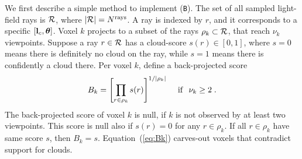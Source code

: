 \documentclass[runningheads]{llncs}
\begin{document}
We first describe a simple method to implement ({\tt B}).  The set of all sampled light-field rays is ${\cal R}$, where
\mbox{$|{\cal R}|=N^{\rm rays}$}. A ray is indexed by $r$, and it corresponds to a specific $[{\bf l}_c,{\bm \theta}]$. Voxel $k$ projects to a subset of the rays $\rho_k\subset{\cal R}$,
that reach $\nu_k$ viewpoints. Suppose a ray $r\in{\cal R}$ has a cloud-score $s(r)\in[0,1]$, where \mbox{$s=0$} means there is definitely no cloud on the ray, while \mbox{$s=1$} means there is confidently a cloud there. Per voxel $k$, define a back-projected score
\begin{equation}
 B_k= \left[ \prod_{r\in\rho_k} s(r)\right]^{1/|\rho_k|}
 \;\; ~~{\rm if}~~ \nu_k\geq 2
  \;.
 \label{eq:Bk}
\end{equation}
The back-projected score of voxel $k$ is null, if $k$ is not observed by at least two viewpoints. This score is null also if $s(r)=0$ for any $r\in\rho_k$. If all $r\in\rho_k$ have same score $s$, then $B_k=s$. Equation~(\ref{eq:Bk}) carves-out voxels that contradict support for clouds.
\end{document}
